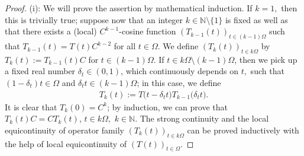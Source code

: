 \documentclass[10pt,a4paper]{amsart}
\begin{document}
\begin{proof}
(i): We will prove the assertion by mathematical induction. If $k=1,$ then this is trivially true; suppose now that an integer $k\in {\mathbb N} \setminus \{1\}$ is fixed as well as that there exists a (local) $C^{k-1}$-cosine function $(T_{k-1}(t))_{t\in (k-1)\Omega}$ such that $T_{k-1}(t)=T(t)C^{k-2}$ for all $t\in \Omega.$ We define $(T_{k}(t))_{t\in k\Omega}$ by $T_{k}(t):=T_{k-1}(t)C$ for $t\in (k-1) \Omega$. If $t\in k\Omega \setminus (k-1)\Omega$, then we pick up a fixed real number $\delta_{t} \in (0,1)$, which continuously depends on $t,$ such that $(1-\delta_{t})t\in \Omega $ and $\delta_{t}t\in (k-1)\Omega$; in this case, we define 
\begin{align}\label{se}
T_{k}(t):=T\bigl(t-\delta_{t}t\bigr)T_{k-1}\bigl(\delta_{t}t\bigr).
\end{align} 
It is clear that $T_{k}(0)=C^{k}$; by induction, we can prove that $T_{k}(t)C=CT_{k}(t)$, $t\in k\Omega,$ $k\in {\mathbb N}.$ The strong continuity and the local equicontinuity of operator family $(T_{k}(t))_{t\in k\Omega}$ can be proved inductively with the help of local equicontinuity of $(T(t))_{t\in \Omega}$.


\end{proof}
\end{document}
